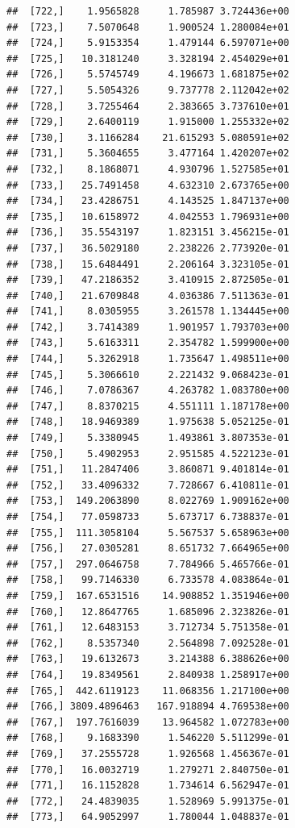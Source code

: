 \documentclass[article]{jss}\usepackage[]{graphicx}\usepackage[]{xcolor}
\makeatletter
\newenvironment{kframe}{%
 \def\at@end@of@kframe{}%
 \ifinner\ifhmode%
  \def\at@end@of@kframe{\end{minipage}}%
  \begin{minipage}{\columnwidth}%
 \fi\fi%
 \def\FrameCommand##1{\hskip\@totalleftmargin \hskip-\fboxsep
 \colorbox{shadecolor}{##1}\hskip-\fboxsep
     \hskip-\linewidth \hskip-\@totalleftmargin \hskip\columnwidth}%
 \MakeFramed {\advance\hsize-\width
   \@totalleftmargin\z@ \linewidth\hsize
   \@setminipage}}%
 {\par\unskip\endMakeFramed%
 \at@end@of@kframe}
\newenvironment{knitrout}{}{} %
\makeatother
\begin{document}
\begin{knitrout}
\begin{kframe}
\begin{verbatim}
##  [722,]    1.9565828     1.785987 3.724436e+00
##  [723,]    7.5070648     1.900524 1.280084e+01
##  [724,]    5.9153354     1.479144 6.597071e+00
##  [725,]   10.3181240     3.328194 2.454029e+01
##  [726,]    5.5745749     4.196673 1.681875e+02
##  [727,]    5.5054326     9.737778 2.112042e+02
##  [728,]    3.7255464     2.383665 3.737610e+01
##  [729,]    2.6400119     1.915000 1.255332e+02
##  [730,]    3.1166284    21.615293 5.080591e+02
##  [731,]    5.3604655     3.477164 1.420207e+02
##  [732,]    8.1868071     4.930796 1.527585e+01
##  [733,]   25.7491458     4.632310 2.673765e+00
##  [734,]   23.4286751     4.143525 1.847137e+00
##  [735,]   10.6158972     4.042553 1.796931e+00
##  [736,]   35.5543197     1.823151 3.456215e-01
##  [737,]   36.5029180     2.238226 2.773920e-01
##  [738,]   15.6484491     2.206164 3.323105e-01
##  [739,]   47.2186352     3.410915 2.872505e-01
##  [740,]   21.6709848     4.036386 7.511363e-01
##  [741,]    8.0305955     3.261578 1.134445e+00
##  [742,]    3.7414389     1.901957 1.793703e+00
##  [743,]    5.6163311     2.354782 1.599900e+00
##  [744,]    5.3262918     1.735647 1.498511e+00
##  [745,]    5.3066610     2.221432 9.068423e-01
##  [746,]    7.0786367     4.263782 1.083780e+00
##  [747,]    8.8370215     4.551111 1.187178e+00
##  [748,]   18.9469389     1.975638 5.052125e-01
##  [749,]    5.3380945     1.493861 3.807353e-01
##  [750,]    5.4902953     2.951585 4.522123e-01
##  [751,]   11.2847406     3.860871 9.401814e-01
##  [752,]   33.4096332     7.728667 6.410811e-01
##  [753,]  149.2063890     8.022769 1.909162e+00
##  [754,]   77.0598733     5.673717 6.738837e-01
##  [755,]  111.3058104     5.567537 5.658963e+00
##  [756,]   27.0305281     8.651732 7.664965e+00
##  [757,]  297.0646758     7.784966 5.465766e-01
##  [758,]   99.7146330     6.733578 4.083864e-01
##  [759,]  167.6531516    14.908852 1.351946e+00
##  [760,]   12.8647765     1.685096 2.323826e-01
##  [761,]   12.6483153     3.712734 5.751358e-01
##  [762,]    8.5357340     2.564898 7.092528e-01
##  [763,]   19.6132673     3.214388 6.388626e+00
##  [764,]   19.8349561     2.840938 1.258917e+00
##  [765,]  442.6119123    11.068356 1.217100e+00
##  [766,] 3809.4896463   167.918894 4.769538e+00
##  [767,]  197.7616039    13.964582 1.072783e+00
##  [768,]    9.1683390     1.546220 5.511299e-01
##  [769,]   37.2555728     1.926568 1.456367e-01
##  [770,]   16.0032719     1.279271 2.840750e-01
##  [771,]   16.1152828     1.734614 6.562947e-01
##  [772,]   24.4839035     1.528969 5.991375e-01
##  [773,]   64.9052997     1.780044 1.048837e-01

\end{verbatim}
\end{kframe}
\end{knitrout}
\end{document}
